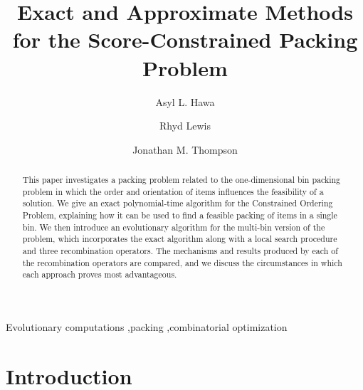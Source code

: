 \documentclass[a4paper,11pt,authoryear]{elsarticle}
\begin{document}
	
\begin{frontmatter}
\title{Exact and Approximate Methods for the Score-Constrained Packing Problem}
\author[1]{Asyl L. Hawa}
\address[1]{Southampton Business School, University of Southampton, Southampton SO17 1BJ, UK}

\author[2]{Rhyd Lewis}
\author[2]{Jonathan M. Thompson}
\address[2]{School of Mathematics, Cardiff University, Senghennydd Road, Cardiff, CF24 4AG, UK}

\begin{abstract}
This paper investigates a packing problem related to the one-dimensional bin packing problem in which the order and orientation of items influences the feasibility of a solution. We give an exact polynomial-time algorithm for the Constrained Ordering Problem, explaining how it can be used to find a feasible packing of items in a single bin. We then introduce an evolutionary algorithm for the multi-bin version of the problem, which incorporates the exact algorithm along with a local search procedure and three recombination operators. The mechanisms and results produced by each of the recombination operators are compared, and we discuss the circumstances in which each approach proves most advantageous. 

\end{abstract}

\begin{keyword}
	Evolutionary computations \sep packing \sep combinatorial optimization
\end{keyword}

\end{frontmatter}

\section{Introduction}
\label{sec:intro}
\end{document}
